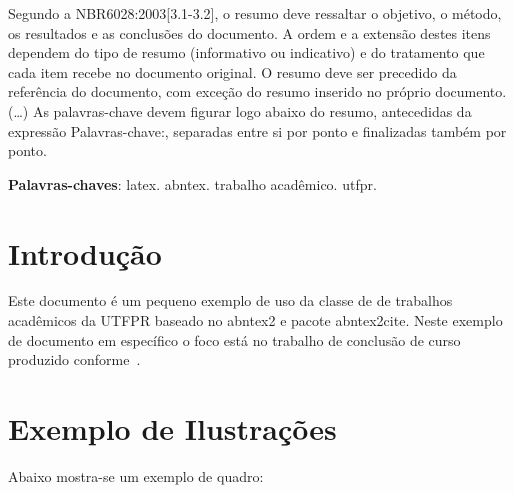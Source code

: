 \documentclass{utfpr-pg}
\begin{document}
\frenchspacing 
\pretextual
\imprimircapa
\imprimirfolhaderosto*

\begin{resumo}
Segundo a NBR6028:2003[3.1-3.2], o resumo deve ressaltar o objetivo, o método, os resultados e as conclusões do documento. A ordem e a extensão destes itens dependem do tipo de resumo (informativo ou indicativo) e do tratamento que cada item recebe no documento original. O resumo deve ser precedido da referência do documento, com exceção do resumo inserido no próprio documento. (\ldots) As palavras-chave devem figurar logo abaixo do resumo, antecedidas da expressão Palavras-chave:, separadas entre si por ponto e finalizadas também por ponto.

\vspace{\onelineskip}
\noindent
\textbf{Palavras-chaves}: latex. abntex. trabalho acadêmico. utfpr.
\end{resumo}

\listoffigures*
\cleardoublepage

\listofquadros*
\cleardoublepage

\listoftables*
\cleardoublepage


\tableofcontents*
\cleardoublepage



\textual

\chapter{Introdução}
Este documento é um pequeno exemplo de uso da classe de de trabalhos acadêmicos da UTFPR baseado no \textsf{abntex2} e pacote \textsf{abntex2cite}. Neste exemplo de documento em específico o foco está no trabalho de conclusão de curso produzido conforme~.

\chapter{Exemplo de Ilustrações}
Abaixo mostra-se um exemplo de quadro:
\end{document}
